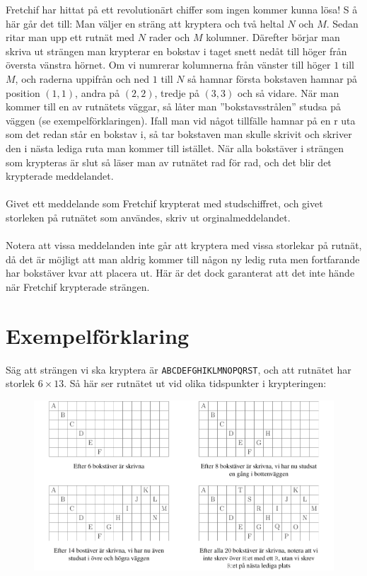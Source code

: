 \noindent
Fretchif har hittat på ett revolutionärt chiffer som ingen kommer kunna lösa! S
å här går det till: Man väljer en sträng att kryptera och två heltal $N$ och $M$. 
Sedan ritar man upp ett rutnät med $N$ rader och $M$ kolumner. 
Därefter börjar man skriva ut strängen man krypterar en bokstav i taget snett 
nedåt till höger från översta vänstra hörnet. Om vi numrerar kolumnerna från 
vänster till höger $1$ till $M$, och raderna uppifrån och ned $1$ till $N$ så 
hamnar första bokstaven hamnar på position $(1,1)$, andra på $(2,2)$, tredje på $(3,3)$ 
och så vidare. När man kommer till en av rutnätets väggar, så låter man ”bokstavsstrålen” 
studsa på väggen (se exempelförklaringen). Ifall man vid något tillfälle hamnar på en r
uta som det redan står en bokstav i, så tar bokstaven man skulle skrivit och skriver 
den i nästa lediga ruta man kommer till istället. När alla bokstäver i strängen som 
krypteras är slut så läser man av rutnätet rad för rad, och det blir det krypterade meddelandet. 
\\ \\
Givet ett meddelande som Fretchif krypterat med studschiffret, 
och givet storleken på rutnätet som användes, skriv ut orginalmeddelandet.
\\ \\
Notera att vissa meddelanden inte går att kryptera med vissa storlekar på rutnät, 
då det är möjligt att man aldrig kommer till någon ny ledig ruta men fortfarande 
har bokstäver kvar att placera ut. Här är det dock garanterat att det 
inte hände när Fretchif krypterade strängen.

\section*{Exempelförklaring}
Säg att strängen vi ska kryptera är \texttt{ABCDEFGHIKLMNOPQRST}, och att rutnätet har storlek $6 \times 13$.
Så här ser rutnätet ut vid olika tidspunkter i krypteringen: \hspace{25cm}
\begin{figure}[!h]
  \centering
      \includegraphics[width=1\textwidth]{grids.pdf}
\end{figure}

